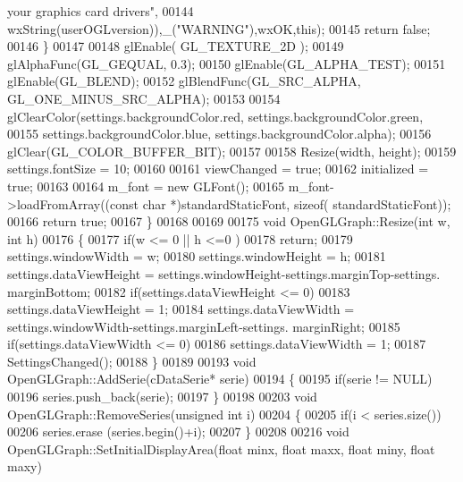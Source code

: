 \begin{DoxyCode}
{{       your graphics card drivers"},
00144                                       wxString(userOGLversion)),\_(\textcolor{stringliteral}{"WARNING"}),wxOK,\textcolor{keyword}{this});
00145         \textcolor{keywordflow}{return} \textcolor{keyword}{false};
00146     \}
00147 
00148     glEnable( GL_TEXTURE_2D );
00149     glAlphaFunc(GL_GEQUAL, 0.3);
00150     glEnable(GL_ALPHA_TEST);
00151     glEnable(GL_BLEND);
00152     glBlendFunc(GL_SRC_ALPHA, GL_ONE_MINUS_SRC_ALPHA);
00153 
00154     glClearColor(settings.backgroundColor.red, settings.backgroundColor.green,
00155                 settings.backgroundColor.blue, settings.backgroundColor.alpha);
00156     glClear(GL_COLOR_BUFFER_BIT);
00157 
00158     Resize(width, height);
00159     settings.fontSize = 10;
00160 
00161     viewChanged = \textcolor{keyword}{true};
00162     initialized = \textcolor{keyword}{true};
00163 
00164     m_font = \textcolor{keyword}{new} GLFont();
00165     m_font->loadFromArray((\textcolor{keyword}{const} \textcolor{keywordtype}{char} *)standardStaticFont, \textcolor{keyword}{sizeof}(
      standardStaticFont));
00166     \textcolor{keywordflow}{return} \textcolor{keyword}{true};
00167 \}
00168 
00169 
00175 \textcolor{keywordtype}{void} OpenGLGraph::Resize(\textcolor{keywordtype}{int} w, \textcolor{keywordtype}{int} h)
00176 \{
00177   \textcolor{keywordflow}{if}(w <= 0 || h <=0 )
00178     \textcolor{keywordflow}{return};
00179   settings.windowWidth = w;
00180   settings.windowHeight = h;
00181   settings.dataViewHeight = settings.windowHeight-settings.marginTop-settings.
      marginBottom;
00182   \textcolor{keywordflow}{if}(settings.dataViewHeight <= 0)
00183     settings.dataViewHeight = 1;
00184   settings.dataViewWidth = settings.windowWidth-settings.marginLeft-settings.
      marginRight;
00185   \textcolor{keywordflow}{if}(settings.dataViewWidth <= 0)
00186     settings.dataViewWidth = 1;
00187   SettingsChanged();
00188 \}
00189 
00193 \textcolor{keywordtype}{void} OpenGLGraph::AddSerie(cDataSerie* serie)
00194 \{
00195     \textcolor{keywordflow}{if}(serie != NULL)
00196         series.push\_back(serie);
00197 \}
00198 
00203 \textcolor{keywordtype}{void} OpenGLGraph::RemoveSeries(\textcolor{keywordtype}{unsigned} \textcolor{keywordtype}{int} i)
00204 \{
00205     \textcolor{keywordflow}{if}(i < series.size())
00206         series.erase (series.begin()+i);
00207 \}
00208 
00216 \textcolor{keywordtype}{void} OpenGLGraph::SetInitialDisplayArea(\textcolor{keywordtype}{float} minx, \textcolor{keywordtype}{float} maxx, \textcolor{keywordtype}{float} miny, \textcolor{keywordtype}{float} maxy)
}
\end{DoxyCode}
